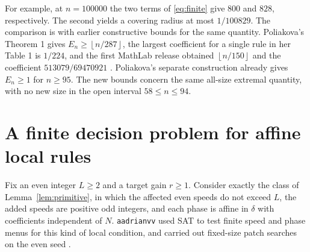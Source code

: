 \documentclass[11pt]{article}
\theoremstyle{definition}
\newcommand{\fl}[1]{\left\lfloor #1\right\rfloor}
\begin{document}
For example, at \(n=100000\) the two terms of \eqref{eq:finite} give
\(800\) and \(828\), respectively. The second yields a covering radius
at most \(1/100829\). The comparison is with earlier constructive
bounds for the same quantity. Poliakova's Theorem 1 gives
\(E_n\ge\fl{n/287}\), the largest coefficient for a single rule in
her Table 1 is \(1/224\), and the first MathLab release obtained
\(\fl{n/150}\) and the coefficient \(513079/69470921\)
\cite{Poliakova,MathLabVOne}. Poliakova's separate construction already
gives \(E_n\ge1\) for \(n\ge95\). The new bounds concern the same
all-size extremal quantity, with no new size in the open interval
\(58\le n\le94\).

\section{A finite decision problem for affine local rules}\label{sec:finite}

Fix an even integer \(L\ge2\) and a target gain \(r\ge1\). Consider
exactly the class of Lemma~\ref{lem:primitive}, in which the affected
even speeds do not exceed \(L\), the added speeds are positive odd
integers, and each phase is affine in \(\delta\) with coefficients
independent of \(N\).
\texttt{aadrianvv} used SAT to test finite speed and phase menus
for this kind of local condition, and carried out fixed-size patch
searches on the even seed \cite{UpstreamSearch}.
\end{document}
